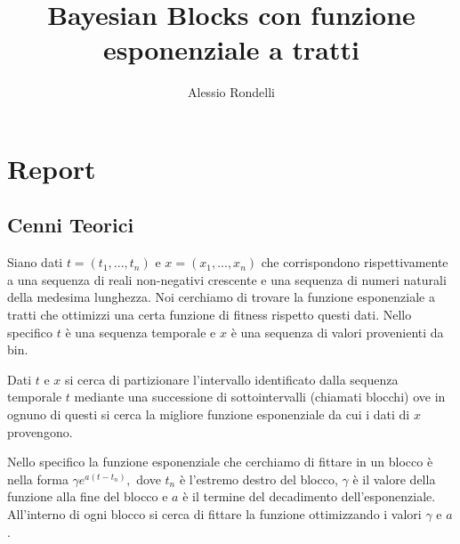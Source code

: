 \documentclass[10pt,a4paper]{report}
\author{Alessio Rondelli}
\title{Bayesian Blocks con funzione esponenziale a tratti}
\begin{document}
\maketitle
\chapter{Report}
\section{Cenni Teorici}
Siano dati $t=(t_1,...,t_n)$ e $x=(x_1,...,x_n)$ che corrispondono rispettivamente a una sequenza di reali non-negativi crescente e una sequenza di numeri naturali della medesima lunghezza. Noi cerchiamo di trovare la funzione esponenziale a tratti che ottimizzi una certa funzione di fitness rispetto questi dati. Nello specifico $t$ è una sequenza temporale e $x$ è una sequenza di valori provenienti da bin.

Dati $t$ e $x$ si cerca di partizionare l'intervallo identificato dalla sequenza temporale $t$ mediante una successione di sottointervalli (chiamati blocchi) ove in ognuno di questi si cerca la migliore funzione esponenziale da cui i dati di $x$ provengono.

Nello specifico la funzione esponenziale che cerchiamo di fittare in un blocco è nella forma $\gamma e^{a(t-t_n)},$ dove $t_n$ è l'estremo destro del blocco, $\gamma$ è il valore della funzione alla fine del blocco e $a$ è il termine del decadimento dell'esponenziale. All'interno di ogni blocco si cerca di fittare la funzione ottimizzando i valori $\gamma$ e $a$.
\end{document}
